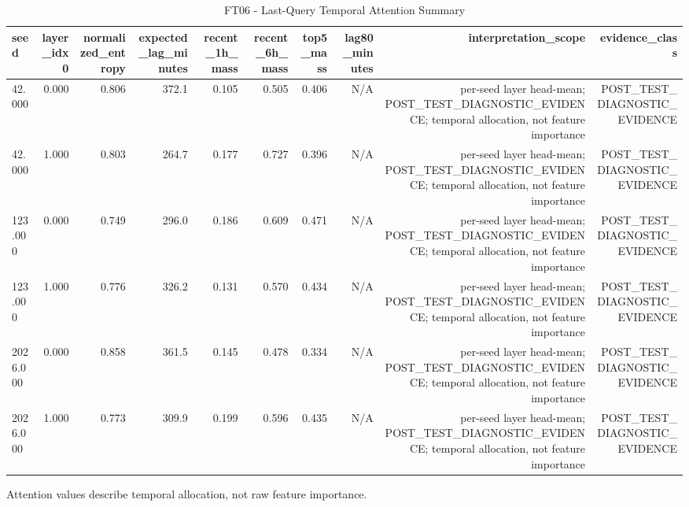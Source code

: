 \begin{table}[h!]
\centering
\caption{FT06 - Last-Query Temporal Attention Summary}
\label{tab:ft06\_-\_last-query\_temporal\_attention\_summary}
\begin{tabular}{lrrrrrrrrr}
\toprule
seed & layer\_idx0 & normalized\_entropy & expected\_lag\_minutes & recent\_1h\_mass & recent\_6h\_mass & top5\_mass & lag80\_minutes & interpretation\_scope & evidence\_class \\
\midrule
42.000 & 0.000 & 0.806 & 372.1 & 0.105 & 0.505 & 0.406 & N/A & per-seed layer head-mean; POST\_TEST\_DIAGNOSTIC\_EVIDENCE; temporal allocation, not feature importance & POST\_TEST\_DIAGNOSTIC\_EVIDENCE \\
42.000 & 1.000 & 0.803 & 264.7 & 0.177 & 0.727 & 0.396 & N/A & per-seed layer head-mean; POST\_TEST\_DIAGNOSTIC\_EVIDENCE; temporal allocation, not feature importance & POST\_TEST\_DIAGNOSTIC\_EVIDENCE \\
123.000 & 0.000 & 0.749 & 296.0 & 0.186 & 0.609 & 0.471 & N/A & per-seed layer head-mean; POST\_TEST\_DIAGNOSTIC\_EVIDENCE; temporal allocation, not feature importance & POST\_TEST\_DIAGNOSTIC\_EVIDENCE \\
123.000 & 1.000 & 0.776 & 326.2 & 0.131 & 0.570 & 0.434 & N/A & per-seed layer head-mean; POST\_TEST\_DIAGNOSTIC\_EVIDENCE; temporal allocation, not feature importance & POST\_TEST\_DIAGNOSTIC\_EVIDENCE \\
2026.000 & 0.000 & 0.858 & 361.5 & 0.145 & 0.478 & 0.334 & N/A & per-seed layer head-mean; POST\_TEST\_DIAGNOSTIC\_EVIDENCE; temporal allocation, not feature importance & POST\_TEST\_DIAGNOSTIC\_EVIDENCE \\
2026.000 & 1.000 & 0.773 & 309.9 & 0.199 & 0.596 & 0.435 & N/A & per-seed layer head-mean; POST\_TEST\_DIAGNOSTIC\_EVIDENCE; temporal allocation, not feature importance & POST\_TEST\_DIAGNOSTIC\_EVIDENCE \\
\bottomrule
\end{tabular}
\vspace{4pt}
\footnotesize{Attention values describe temporal allocation, not raw feature importance.}\\
\end{table}
